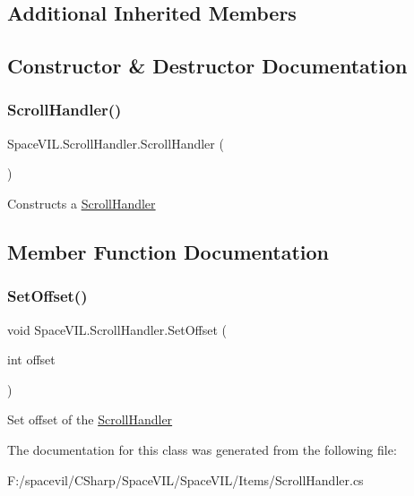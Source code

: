 \subsection*{Additional Inherited Members}


\subsection{Constructor \& Destructor Documentation}
\mbox{\label{class_space_v_i_l_1_1_scroll_handler_a95452d5c586be5d21542dd743639cd62}} 
\subsubsection{\texorpdfstring{Scroll\+Handler()}{ScrollHandler()}}
{\footnotesize\ttfamily Space\+V\+I\+L.\+Scroll\+Handler.\+Scroll\+Handler (\begin{DoxyParamCaption}{ }\end{DoxyParamCaption})\hspace{0.3cm}{\ttfamily [inline]}}



Constructs a \mbox{\hyperlink{class_space_v_i_l_1_1_scroll_handler}{Scroll\+Handler}} 



\subsection{Member Function Documentation}
\mbox{\label{class_space_v_i_l_1_1_scroll_handler_abce983699a4e1e947d6e6b8f91a97080}} 
\subsubsection{\texorpdfstring{Set\+Offset()}{SetOffset()}}
{\footnotesize\ttfamily void Space\+V\+I\+L.\+Scroll\+Handler.\+Set\+Offset (\begin{DoxyParamCaption}\item[{int}]{offset }\end{DoxyParamCaption})\hspace{0.3cm}{\ttfamily [inline]}}



Set offset of the \mbox{\hyperlink{class_space_v_i_l_1_1_scroll_handler}{Scroll\+Handler}} 



The documentation for this class was generated from the following file\+:\begin{DoxyCompactItemize}
\item 
F\+:/spacevil/\+C\+Sharp/\+Space\+V\+I\+L/\+Space\+V\+I\+L/\+Items/Scroll\+Handler.\+cs\end{DoxyCompactItemize}
